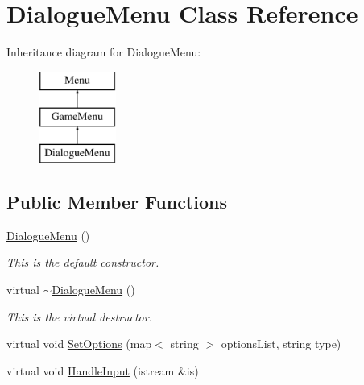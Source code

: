 \hypertarget{classDialogueMenu}{\section{Dialogue\-Menu Class Reference}
\label{classDialogueMenu}
}
Inheritance diagram for Dialogue\-Menu\-:\begin{figure}[H]
\begin{center}
\leavevmode
\includegraphics[height=3.000000cm]{classDialogueMenu}
\end{center}
\end{figure}
\subsection*{Public Member Functions}
\begin{DoxyCompactItemize}
\item 
\hypertarget{classDialogueMenu_a062e15c446d9a559a20bfdc19fb190c5}{\hyperlink{classDialogueMenu_a062e15c446d9a559a20bfdc19fb190c5}{Dialogue\-Menu} ()}\label{classDialogueMenu_a062e15c446d9a559a20bfdc19fb190c5}

\begin{DoxyCompactList}\small\item\em This is the default constructor. \end{DoxyCompactList}\item 
\hypertarget{classDialogueMenu_a4d024e323001647260b1ba5fed12689a}{virtual \hyperlink{classDialogueMenu_a4d024e323001647260b1ba5fed12689a}{$\sim$\-Dialogue\-Menu} ()}\label{classDialogueMenu_a4d024e323001647260b1ba5fed12689a}

\begin{DoxyCompactList}\small\item\em This is the virtual destructor. \end{DoxyCompactList}\item 
virtual void \hyperlink{classDialogueMenu_ad9ce118b0515147fd59188e986cfbfee}{Set\-Options} (map$<$ string $>$ options\-List, string type)
\item 
virtual void \hyperlink{classDialogueMenu_a2fa399f6e56c5421f161c0e90e17ac13}{Handle\-Input} (istream \&is)
\end{DoxyCompactItemize}
